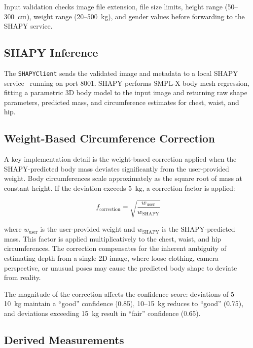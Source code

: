 Input validation checks image file extension, file size limits, height range (50--300~cm), weight range (20--500~kg), and gender values before forwarding to the SHAPY service.

\subsection{SHAPY Inference}

The \texttt{SHAPYClient} sends the validated image and metadata to a local SHAPY service~\cite{choutas2022shapy} running on port 8001. SHAPY performs SMPL-X body mesh regression, fitting a parametric 3D body model to the input image and returning raw shape parameters, predicted mass, and circumference estimates for chest, waist, and hip.

\subsection{Weight-Based Circumference Correction}

A key implementation detail is the weight-based correction applied when the SHAPY-predicted body mass deviates significantly from the user-provided weight. Body circumferences scale approximately as the square root of mass at constant height. If the deviation exceeds 5~kg, a correction factor is applied:

\begin{equation}
    f_{\text{correction}} = \sqrt{\frac{w_{\text{user}}}{w_{\text{SHAPY}}}}
    \label{eq:weight-correction}
\end{equation}

where $w_{\text{user}}$ is the user-provided weight and $w_{\text{SHAPY}}$ is the SHAPY-predicted mass. This factor is applied multiplicatively to the chest, waist, and hip circumferences. The correction compensates for the inherent ambiguity of estimating depth from a single 2D image, where loose clothing, camera perspective, or unusual poses may cause the predicted body shape to deviate from reality.

The magnitude of the correction affects the confidence score: deviations of 5--10~kg maintain a ``good'' confidence (0.85), 10--15~kg reduces to ``good'' (0.75), and deviations exceeding 15~kg result in ``fair'' confidence (0.65).

\subsection{Derived Measurements}

